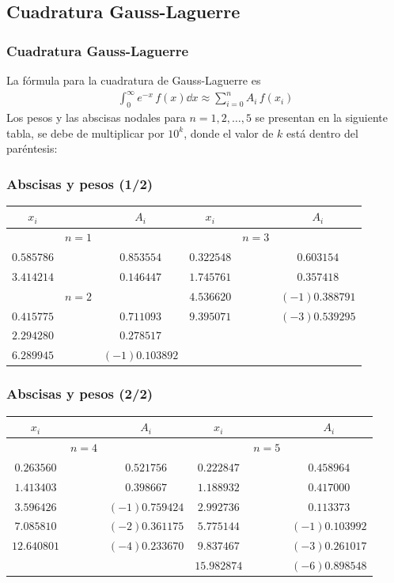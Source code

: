 \subsection{Cuadratura Gauss-Laguerre}
\begin{frame}
\frametitle{Cuadratura Gauss-Laguerre}
La fórmula para la cuadratura de Gauss-Laguerre es
\begin{align*}
\int_{0}^{\infty} e^{-x} \, f(x) \dd{x} \approx \sum_{i=0}^{n} A_{i} \, f(x_{i})
\end{align*}
Los pesos y las abscisas nodales para $n = 1, 2, \ldots, 5$ se presentan en la siguiente tabla, se debe de multiplicar por $10^{k}$, donde el valor de $k$ está dentro del paréntesis:
\end{frame}
\begin{frame}
\frametitle{Abscisas y pesos (1/2)}
\fontsize{10}{10}\selectfont
\begin{table}
\centering
\begin{tabular}{|c c c | c c c|}
\hline
$x_{i}$ & & $A_{i}$ & $x_{i}$ & & $A_{i}$ \\ \hline
 & $n=1$ & & & $n=3$ & \\ %
$0.585786$ & & $0.853554$ & $0.322548$ & & $0.603154$ \\ %
$3.414214$ & & $0.146447$ & $1.745761$ & & $0.357418$ \\
 & $n=2$ & & $4.536620$ & & $(-1)0.388791$ \\ %
$0.415775$ & & $0.711093$ & $9.395071$ & & $(-3)0.539295$ \\
$2.294280$ & & $0.278517$ & & & \\ %
$6.289945$ & & $(-1)0.103892$ & & & \\ \hline
\end{tabular}
\end{table}
\end{frame}
\begin{frame}
\frametitle{Abscisas y pesos (2/2)}
\fontsize{10}{10}\selectfont
\begin{table}
\centering
\begin{tabular}{|c c c | c c c|}
\hline
$x_{i}$ & & $A_{i}$ & $x_{i}$ & & $A_{i}$ \\ \hline
 & $n=4$ & & & $n=5$ & \\ %
$0.263560$ & & $0.521756$ & $0.222847$ & & $0.458964$\\ %
$1.413403$ & & $0.398667$ & $1.188932$ & & $0.417000$ \\
$3.596426$ & & $(-1)0.759424$ & $2.992736$ & & $0.113373$  \\ %
$7.085810$ & & $(-2)0.361175$ & $5.775144$ & & $(-1)0.103992$ \\ %
$12.640801$ & & $(-4)0.233670$ & $9.837467$ & & $(-3)0.261017$  \\ %
 & & & $15.982874$ & & $(-6)0.898548$ \\ \hline
\end{tabular}
\end{table}
\end{frame}
